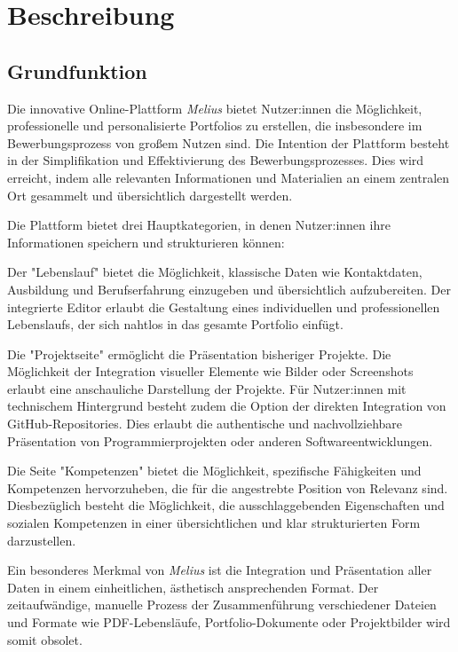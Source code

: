 
\section{Beschreibung}

\subsection{Grundfunktion}

Die innovative Online-Plattform \textit{Melius} bietet Nutzer:innen die Möglichkeit, professionelle und personalisierte Portfolios zu erstellen, die insbesondere im Bewerbungsprozess von großem Nutzen sind. Die Intention der Plattform besteht in der Simplifikation und Effektivierung des Bewerbungsprozesses. Dies wird erreicht, indem alle relevanten Informationen und Materialien an einem zentralen Ort gesammelt und übersichtlich dargestellt werden.

Die Plattform bietet drei Hauptkategorien, in denen Nutzer:innen ihre Informationen speichern und strukturieren können:

Der "Lebenslauf" bietet die Möglichkeit, klassische Daten wie Kontaktdaten, Ausbildung und Berufserfahrung einzugeben und übersichtlich aufzubereiten. Der integrierte Editor erlaubt die Gestaltung eines individuellen und professionellen Lebenslaufs, der sich nahtlos in das gesamte Portfolio einfügt.

Die "Projektseite" ermöglicht die Präsentation bisheriger Projekte. Die Möglichkeit der Integration visueller Elemente wie Bilder oder Screenshots erlaubt eine anschauliche Darstellung der Projekte. Für Nutzer:innen mit technischem Hintergrund besteht zudem die Option der direkten Integration von GitHub-Repositories. Dies erlaubt die authentische und nachvollziehbare Präsentation von Programmierprojekten oder anderen Softwareentwicklungen.

Die Seite "Kompetenzen" bietet die Möglichkeit, spezifische Fähigkeiten und Kompetenzen hervorzuheben, die für die angestrebte Position von Relevanz sind. Diesbezüglich besteht die Möglichkeit, die ausschlaggebenden Eigenschaften und sozialen Kompetenzen in einer übersichtlichen und klar strukturierten Form darzustellen.

\newpage

Ein besonderes Merkmal von \textit{Melius} ist die Integration und Präsentation aller Daten in einem einheitlichen, ästhetisch ansprechenden Format. Der zeitaufwändige, manuelle Prozess der Zusammenführung verschiedener Dateien und Formate wie PDF-Lebensläufe, Portfolio-Dokumente oder Projektbilder wird somit obsolet.

